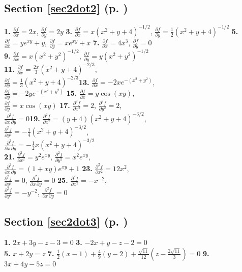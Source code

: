 \begin{multicols}{2}
\subsection*{Section \ref{sec2dot2} (p. \pageref{sec2dot2})}
\textbf{1.} $\frac{\partial f}{\partial x} = 2x$, $\frac{\partial f}{\partial y} = 2y$\quad
\textbf{3.} $\frac{\partial f}{\partial x} = x(x^2 + y + 4)^{-1/2}$,
$\frac{\partial f}{\partial y} = \frac{1}{2}(x^2 + y + 4)^{-1/2}$\quad
\textbf{5.} $\frac{\partial f}{\partial x} = ye^{xy} + y$, $\frac{\partial f}{\partial y} = xe^{xy} + x$\quad
\textbf{7.} $\frac{\partial f}{\partial x} = 4x^3$, $\frac{\partial f}{\partial y} = 0$\\\textbf{9.}
$\frac{\partial f}{\partial x}=x(x^2 + y^2 )^{-1/2}$, $\frac{\partial f}{\partial y}=y(x^2 + y^2 )^{-1/2}$\\\textbf{11.}
$\frac{\partial f}{\partial x} = \frac{2x}{3}(x^2 + y + 4)^{-2/3}$,\\
$\frac{\partial f}{\partial y} = \frac{1}{3}(x^2 + y + 4)^{-2/3}$\quad\textbf{13.}
$\frac{\partial f}{\partial x}=-2xe^{-(x^2 + y^2 )}$,\\$\frac{\partial f}{\partial y}=-2ye^{-(x^2 + y^2 )}$\quad
\textbf{15.} $\frac{\partial f}{\partial x} = y\cos(xy)$,\\$\frac{\partial f}{\partial y} = x\cos(xy)$\quad
\textbf{17.}
$\frac{\partial^2 f}{\partial x^2} =2$,
$\frac{\partial^2 f}{\partial y^2} = 2$,\\
$\frac{\partial^2 f}{\partial x \,\partial y} = 0$\quad\textbf{19.}
$\frac{\partial^2 f}{\partial x^2} = (y+4)(x^2 + y+4)^{-3/2}$,\\
$\frac{\partial^2 f}{\partial y^2} = -\frac{1}{4}(x^2 + y+4)^{-3/2}$,\\
$\frac{\partial^2 f}{\partial x \,\partial y} = -\frac{1}{2}x(x^2 + y+4)^{-3/2}$\\\textbf{21.}
$\frac{\partial^2 f}{\partial x^2} = y^2 e^{xy}$,
$\frac{\partial^2 f}{\partial y^2} = x^2 e^{xy}$,\\
$\frac{\partial^2 f}{\partial x \,\partial y} = (1+xy)e^{xy} + 1$\quad
\textbf{23.} $\frac{\partial^2 f}{\partial x^2} =12x^2$,\\
$\frac{\partial^2 f}{\partial y^2} = 0$,
$\frac{\partial^2 f}{\partial x \,\partial y} = 0$\quad
\textbf{25.} $\frac{\partial^2 f}{\partial x^2} =-x^{-2}$,\\
$\frac{\partial^2 f}{\partial y^2} = -y^{-2}$,
$\frac{\partial^2 f}{\partial x \,\partial y} = 0$
\subsection*{Section \ref{sec2dot3} (p. \pageref{sec2dot3})}
\textbf{1.} $2x+3y-z-3=0$\quad
\textbf{3.} $-2x+y-z-2=0$\\\textbf{5.} $x+2y=z$\quad
\textbf{7.} $\frac{1}{2}(x-1)+\frac{4}{9}(y-2)+\frac{\sqrt{11}}{12}(z-\frac{2\sqrt{11}}{3})=0$\quad
\textbf{9.} $3x+4y-5z=0$

\end{multicols}

